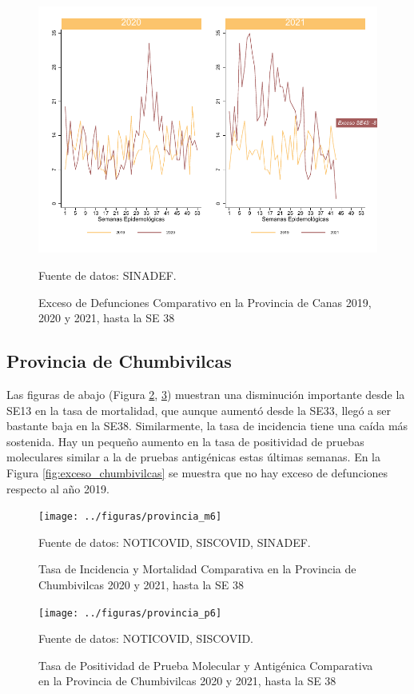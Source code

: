 \documentclass[12pt,a4paper,openany]{book}
\begin{document}
	\begin{figure}[h]
	\caption{Exceso de Defunciones Comparativo en la Provincia de Canas 2019, 2020 y 2021, hasta la SE 38}\label{fig:exceso_canchis}
	\begin{center}
		\includegraphics[width=0.7\linewidth]{../figuras/exceso_5}
	\end{center}
	{\footnotesize {Fuente de datos: SINADEF.}}
	\end{figure}

\clearpage

	\subsection*{Provincia de Chumbivilcas}
	\noindent Las figuras de abajo (Figura \ref{fig:inc_mort_chumbivilcas}, \ref{fig:positividad_chumbivilcas})  muestran una disminución importante desde la SE13 en la tasa de mortalidad, que aunque aumentó desde la SE33, llegó a ser bastante baja en la SE38. Similarmente, la tasa de incidencia tiene una caída más sostenida. Hay un pequeño aumento en la tasa de positividad de pruebas moleculares similar a la de pruebas antigénicas estas últimas semanas. En la Figura \ref{fig:exceso_chumbivilcas} se muestra que no hay exceso de defunciones respecto al año 2019.

	\begin{figure}[h]
	\caption{Tasa de Incidencia y Mortalidad Comparativa en la Provincia de Chumbivilcas 2020 y 2021, hasta la SE 38}\label{fig:inc_mort_chumbivilcas}
	\begin{center}
		\texttt{[image: ../figuras/provincia\_m6]}
	\end{center}
	{\footnotesize {Fuente de datos: NOTICOVID, SISCOVID, SINADEF.}}
	\end{figure}

	\begin{figure}[h]
	\caption{Tasa de Positividad de Prueba Molecular y Antigénica Comparativa en la Provincia de Chumbivilcas 2020 y 2021, hasta la SE 38}\label{fig:positividad_chumbivilcas}
	\begin{center}
		\texttt{[image: ../figuras/provincia\_p6]}
	\end{center}
	{\footnotesize {Fuente de datos: NOTICOVID, SISCOVID.}}
	\end{figure}
\end{document}

